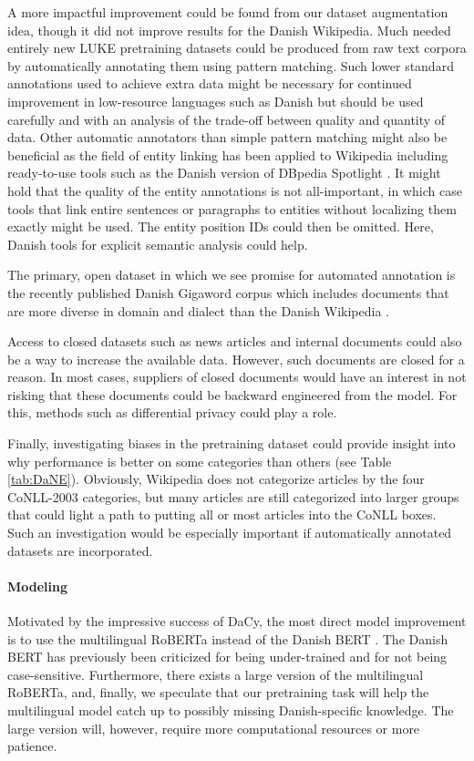 \documentclass[main.tex]{subfiles}
\begin{document}
A more impactful improvement could be found from our dataset augmentation idea, though it did not improve results for the Danish Wikipedia.
Much needed entirely new LUKE pretraining datasets could be produced from raw text corpora by automatically annotating them using pattern matching.
Such lower standard annotations used to achieve extra data might be necessary for continued improvement in low-resource languages such as Danish but should be used carefully and with an analysis of the trade-off between quality and quantity of data.
Other automatic annotators than simple pattern matching might also be beneficial as the field of entity linking has been applied to Wikipedia \cite{brochier2021wikilink} including ready-to-use tools such as the Danish version of DBpedia Spotlight \cite{isem2013daiber}.
It might hold that the quality of the entity annotations is not all-important, in which case tools that link entire sentences or paragraphs to entities without localizing them exactly might be used.
The entity position IDs could then be omitted.
Here, Danish tools for explicit semantic analysis \cite{hansen2017esa} could help.

The primary, open dataset in which we see promise for automated annotation is the recently published Danish Gigaword corpus which includes documents that are more diverse in domain and dialect than the Danish Wikipedia \cite{derc2021giga}.

Access to closed datasets such as news articles and internal documents could also be a way to increase the available data.
However, such documents are closed for a reason.
In most cases, suppliers of closed documents would have an interest in not risking that these documents could be backward engineered from the model.
For this, methods such as differential privacy \cite{GONG2020131} could play a role.

Finally, investigating biases in the pretraining dataset could provide insight into why performance is better on some categories than others (see Table \ref{tab:DaNE}).
Obviously, Wikipedia does not categorize articles by the four CoNLL-2003 categories, but many articles are still categorized into larger groups that could light a path to putting all or most articles into the CoNLL boxes.
Such an investigation would be especially important if automatically annotated datasets are incorporated.

\paragraph{Modeling}
Motivated by the impressive success of DaCy, the most direct model improvement is to use the multilingual RoBERTa \cite{conneau2020unsupervised} instead of the Danish BERT \cite{botxo2019dabert}.
The Danish BERT has previously been criticized for being under-trained \cite{derc2021giga, nielsen2020textsum} and for not being case-sensitive.
Furthermore, there exists a large version of the multilingual RoBERTa, and, finally, we speculate that our pretraining task will help the multilingual model catch up to possibly missing Danish-specific knowledge.
The large version will, however, require more computational resources or more patience.
\end{document}
